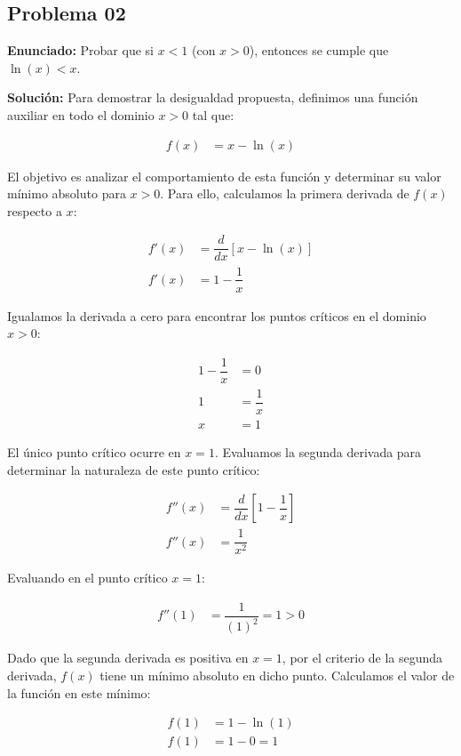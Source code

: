 \subsection*{Problema 02}

\noindent\textbf{Enunciado:} 
Probar que si $x < 1$ (con $x > 0$), entonces se cumple que $\ln(x) < x$.

\noindent\textbf{Solución:}
Para demostrar la desigualdad propuesta, definimos una función auxiliar en todo el dominio $x > 0$ tal que:

\begin{align*}
    f(x) &= x - \ln(x)
\end{align*}

El objetivo es analizar el comportamiento de esta función y determinar su valor mínimo absoluto para $x > 0$. Para ello, calculamos la primera derivada de $f(x)$ respecto a $x$:

\begin{align*}
    f'(x) &= \dfrac{d}{dx} \left[ x - \ln(x) \right] \\
    f'(x) &= 1 - \dfrac{1}{x}
\end{align*}

Igualamos la derivada a cero para encontrar los puntos críticos en el dominio $x > 0$:

\begin{align*}
    1 - \dfrac{1}{x} &= 0 \\
    1 &= \dfrac{1}{x} \\
    x &= 1
\end{align*}

El único punto crítico ocurre en $x = 1$. Evaluamos la segunda derivada para determinar la naturaleza de este punto crítico:

\begin{align*}
    f''(x) &= \dfrac{d}{dx} \left[ 1 - \dfrac{1}{x} \right] \\
    f''(x) &= \dfrac{1}{x^2}
\end{align*}

Evaluando en el punto crítico $x = 1$:

\begin{align*}
    f''(1) &= \dfrac{1}{(1)^2} = 1 > 0
\end{align*}

Dado que la segunda derivada es positiva en $x = 1$, por el criterio de la segunda derivada, $f(x)$ tiene un mínimo absoluto en dicho punto. Calculamos el valor de la función en este mínimo:

\begin{align*}
    f(1) &= 1 - \ln(1) \\
    f(1) &= 1 - 0 = 1
\end{align*}

